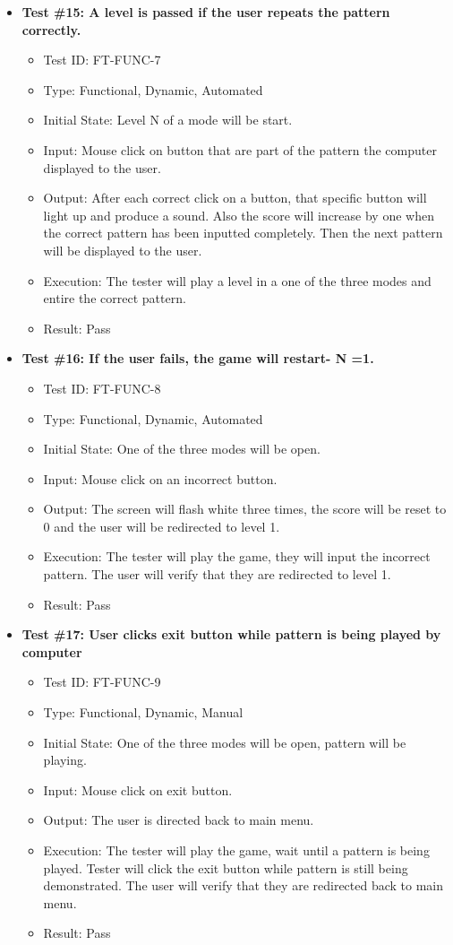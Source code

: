\documentclass[12pt, titlepage]{article}
\begin{document}
\begin{itemize}
\item \textbf{Test \#15: A level is passed if the user repeats the pattern correctly.}
\begin{itemize}
\item Test ID: FT-FUNC-7
\item Type: Functional, Dynamic, Automated		
\item Initial State: Level N of a mode will be start. 					
\item Input: Mouse click on button that are part of the pattern the computer displayed to the user.  	
\item Output: After each correct click on a button, that specific button will light up and produce a sound. Also the score will increase by one when the correct pattern has been inputted completely. Then the next pattern will be displayed to the user. 					
\item Execution: The tester will play a level in a one of the three modes and entire the correct pattern. 
\item Result: Pass
\end{itemize}

\item \textbf{Test \#16: If the user fails, the game will restart- N =1.}
\begin{itemize}
\item Test ID: FT-FUNC-8
\item Type: Functional, Dynamic, Automated	
\item Initial State: One of the three modes will be open. 					
\item Input: Mouse click on an incorrect button. 					
\item Output: The screen will flash white three times, the score will be reset to 0 and the user will be redirected to level 1.
\item Execution: The tester will play the game, they will input the incorrect pattern. The user will verify that they are redirected to level 1.
\item Result: Pass
\end{itemize}

\item \textbf{Test \#17: User clicks exit button while pattern is being played by computer}
\begin{itemize}
\item Test ID: FT-FUNC-9
\item Type: Functional, Dynamic, Manual	
\item Initial State: One of the three modes will be open, pattern will be playing. 					
\item Input: Mouse click on exit button. 					
\item Output: The user is directed back to main menu.					
\item Execution: The tester will play the game, wait until a pattern is being played. Tester will click the exit button while pattern is still being demonstrated. The user will verify that they are redirected back to main menu.
\item Result: Pass
\end{itemize}

\end{itemize}
\end{document}
